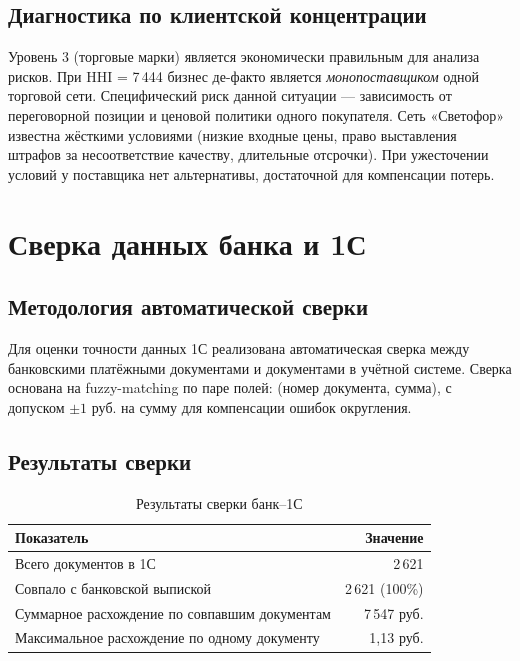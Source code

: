 \subsection{Диагностика по клиентской концентрации}

Уровень 3 (торговые марки) является экономически правильным для анализа рисков. При HHI = 7\,444 бизнес де-факто является \textit{монопоставщиком} одной торговой сети. Специфический риск данной ситуации --- зависимость от переговорной позиции и ценовой политики одного покупателя. Сеть «Светофор» известна жёсткими условиями (низкие входные цены, право выставления штрафов за несоответствие качеству, длительные отсрочки). При ужесточении условий у поставщика нет альтернативы, достаточной для компенсации потерь.

\section{Сверка данных банка и 1С}
\label{sec:reconciliation}

\subsection{Методология автоматической сверки}

Для оценки точности данных 1С реализована автоматическая сверка между банковскими платёжными документами и документами в учётной системе. Сверка основана на fuzzy-matching по паре полей: (номер документа, сумма), с допуском $\pm 1$ руб. на сумму для компенсации ошибок округления.

\subsection{Результаты сверки}

\begin{table}[H]
\centering
\caption{Результаты сверки банк--1С}
\label{tab:reconciliation}
\begin{tabular}{lr}
\toprule
\textbf{Показатель} & \textbf{Значение} \\
\midrule
Всего документов в 1С & 2\,621 \\
Совпало с банковской выпиской & 2\,621 (100\%) \\
Суммарное расхождение по совпавшим документам & 7\,547 руб. \\
Максимальное расхождение по одному документу & 1,13 руб. \\
\bottomrule
\end{tabular}
\end{table}

